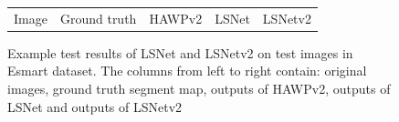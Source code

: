 \documentclass[journal]{IEEEtran}
\begin{document}
\begin{figure}
\begin{tabularx}{\textwidth}{ccccc}

  Image & Ground truth & HAWPv2 & LSNet & LSNetv2
  \end{tabularx}
  \caption{\label{esmart_example_0}Example test results of LSNet and LSNetv2 on test images in Esmart dataset. The columns from left to right contain: original images, ground truth segment map, outputs of HAWPv2, outputs of LSNet and outputs of LSNetv2}
\end{figure}
\end{document}
